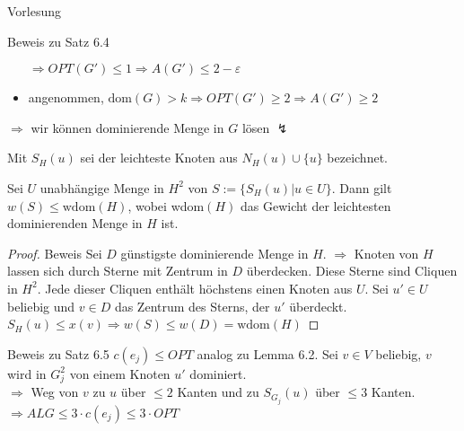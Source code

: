 \begin{section}{Vorlesung}
\begin{subsection}{Beweis zu Satz 6.4}
\begin{itemize}
      $\Rightarrow OPT(G') \leq 1 \Rightarrow A(G') \leq 2-\varepsilon$\\
     \item angenommen, $\text{dom}(G) > k \Rightarrow OPT(G') \geq 2 \Rightarrow A(G') \geq 2$
    \end{itemize}
    $\Rightarrow$ wir können dominierende Menge in $G$ lösen $\lightning$
  \end{subsection}
  \begin{definition}
   Mit $S_H(u)$ sei der leichteste Knoten aus $N_H(u) \cup \{u\}$ bezeichnet.
  \end{definition}
  \begin{lemma}
   Sei $U$ unabhängige Menge in $H^2$ von $S:= \{S_H(u)|u \in U\}$. Dann gilt $w(S) \leq \text{wdom}(H)$, wobei wdom$(H)$ das Gewicht der leichtesten dominierenden Menge in $H$ ist.
  \end{lemma}
  \begin{proof}{Beweis}
   Sei $D$ günstigste dominierende Menge in $H$. $\Rightarrow$ Knoten von $H$ lassen sich durch Sterne mit Zentrum in $D$ überdecken. Diese Sterne sind Cliquen in $H^2$. Jede dieser Cliquen enthält höchstens einen Knoten aus $U$. Sei $u' \in U$ beliebig und $v \in D$ das Zentrum des Sterns, der $u'$ überdeckt.\\
   $S_H(u) \leq x(v) \Rightarrow w(S) \leq w(D) = \text{wdom}(H)$
  \end{proof}
  \begin{subsection}{Beweis zu Satz 6.5}
   $c(e_j) \leq OPT$ analog zu Lemma 6.2. Sei $v \in V$ beliebig, $v$ wird in $G_j^2$ von einem Knoten $u'$ dominiert. \\
   $\Rightarrow$ Weg von $v$ zu $u$ über $\leq 2$ Kanten und zu $S_{G_j}(u)$ über $\leq 3$ Kanten. $\Rightarrow ALG \leq 3\cdot c(e_j) \leq 3\cdot OPT$ 
  \end{subsection}
\end{section}
